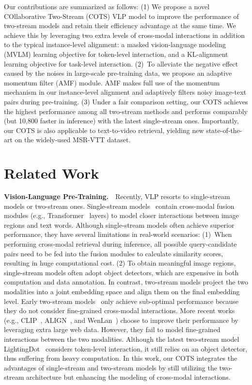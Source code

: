 \documentclass[10pt,twocolumn,letterpaper]{article}
\begin{document}
Our contributions are summarized as follows:
(1) We propose a novel COllaborative Two-Stream (COTS) VLP model to improve the performance of two-stream models and retain their efficiency advantage at the same time. We achieve this by leveraging two extra levels of cross-modal interactions in addition to the typical instance-level alignment: a masked vision-language modeling (MVLM) learning objective for token-level interaction, and a KL-alignment learning objective for task-level interaction.
(2)~To alleviate the negative effect caused by the noises in large-scale pre-training data, we propose an adaptive momentum filter (AMF) module. AMF makes full use of the momentum mechanism in our instance-level alignment and adaptively filters noisy image-text pairs during pre-training.
(3) Under a fair comparison setting, our COTS achieves the highest performance among all two-stream methods and performs comparably (but 10,800 faster in inference) with the latest single-stream ones. Importantly, our COTS is also applicable to text-to-video retrieval, yielding new state-of-the-art on the widely-used MSR-VTT dataset.

\vspace{-0.1cm}
\section{Related Work}
\vspace{-0.1cm}

\noindent\textbf{Vision-Language Pre-Training.}~~Recently, VLP resorts to single-stream models or two-stream ones. Single-stream models~\cite{lu2019vilbert, huang2020pixel, chen2020uniter, gan2020large, li2020oscar, zhang2021vinvl} contain cross-modal fusion modules (e.g., Transformer~\cite{vaswani2017attention} layers) to model closer interactions between image regions and text words. Although single-stream models often achieve superior performance, they have several limitations in real-world scenarios: (1)~When performing cross-modal retrieval during inference, all possible query-candidate pairs need to be fed into the fusion modules to calculate similarity scores, resulting in huge computational cost. (2) To obtain meaningful image regions, single-stream models often adopt object detectors, which are expensive in both computation and data annotation. In contrast, two-stream models project the two modalities into a joint embedding space and align them on the final embedding level. Early two-stream models~\cite{yan2015deep, wang2016learning} only achieve sub-optimal performance because they do not consider fine-grained cross-modal interactions. More recent works (e.g., CLIP~\cite{radford2021learning}, ALIGN~\cite{jia2021scaling}, and WenLan~\cite{huo2021wenlan}) choose to improve their performance by leveraging extra large web data. However, they fail to model fine-grained interactions between the two modalities. Although the latest two-stream model LightingDot~\cite{sun2021lightningdot} considers token-level interaction, it still relies on an object detector, thus suffering from heavy computation. In this work, our COTS integrates the advantages of single-stream and two-stream models by still utilizing the two-stream architecture but enhancing the modeling of cross-modal interactions.
\end{document}
